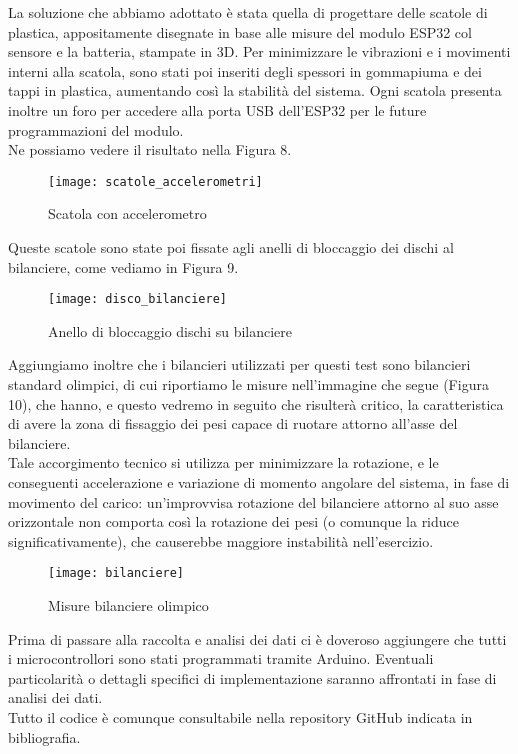 \documentclass[fleqn,10pt]{SelfArx} %
\begin{document}
La soluzione che abbiamo adottato è stata quella di progettare delle scatole di plastica, appositamente 
disegnate in base alle misure del modulo ESP32 col sensore e la batteria, stampate in 3D. Per minimizzare le vibrazioni 
e i movimenti interni alla scatola, sono stati poi inseriti degli spessori in gommapiuma e dei tappi in plastica, 
aumentando così la stabilità del sistema. Ogni scatola presenta inoltre un foro per accedere alla porta USB dell'ESP32 
per le future programmazioni del modulo.\\
Ne possiamo vedere il risultato nella Figura 8.

\begin{figure}[htb!]\centering
	\texttt{[image: scatole\_accelerometri]}
	\caption{Scatola con accelerometro}
	\label{fig:modulo accelerometro}
\end{figure}

Queste scatole sono state poi fissate agli anelli di bloccaggio dei dischi al bilanciere, come vediamo in Figura 9.

\begin{figure}[htb!]\centering
	\texttt{[image: disco\_bilanciere]}
	\caption{Anello di bloccaggio dischi su bilanciere}
	\label{fig:anello di bloccaggio}
\end{figure}

Aggiungiamo inoltre che i bilancieri utilizzati per questi test sono bilancieri standard olimpici, di cui riportiamo 
le misure nell'immagine che segue (Figura 10), che hanno, e questo vedremo in seguito che risulterà critico, 
la caratteristica di avere la zona di fissaggio dei pesi capace di ruotare attorno all'asse del bilanciere. \\
Tale accorgimento tecnico si utilizza per minimizzare la rotazione, e le conseguenti accelerazione e variazione 
di momento angolare del sistema, in fase di movimento del carico: un'improvvisa rotazione del bilanciere attorno 
al suo asse orizzontale non comporta così la rotazione dei pesi (o comunque la riduce significativamente), 
che causerebbe maggiore instabilità nell'esercizio.

\begin{figure}[htb!]\centering
	\texttt{[image: bilanciere]}
	\caption{Misure bilanciere olimpico}
	\label{fig:bilanciere}
\end{figure}

Prima di passare alla raccolta e analisi dei dati ci è doveroso aggiungere che tutti i microcontrollori sono stati 
programmati tramite Arduino. Eventuali particolarità o dettagli specifici di implementazione saranno affrontati in fase 
di analisi dei dati. \\
Tutto il codice è comunque consultabile nella repository GitHub indicata in bibliografia.
\end{document}
